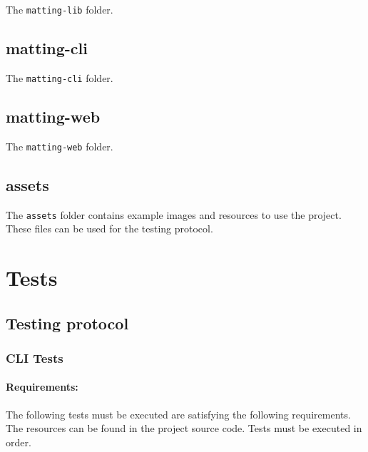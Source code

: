\documentclass[a4paper]{article}
\begin{document}
The \texttt{matting-lib} folder.

\subsection{matting-cli}

The \texttt{matting-cli} folder.

\subsection{matting-web}

The \texttt{matting-web} folder.

\subsection{assets}

The \texttt{assets} folder contains
example images and resources to use the project.
These files can be used for the testing protocol.

\pagebreak

\section{Tests}

\subsection{Testing protocol}

\subsubsection{CLI Tests}

\paragraph{Requirements:}
The following tests must be executed are satisfying the
following requirements. The resources can be found in the project source code.
Tests must be executed in order.
\end{document}
